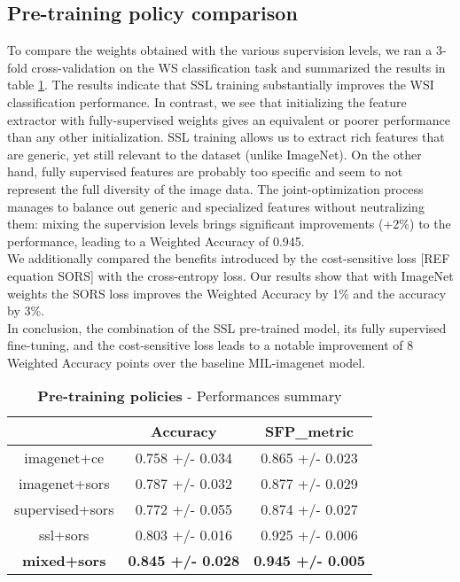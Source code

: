 \subsection{Pre-training policy comparison}
To compare the weights obtained with the various supervision levels, we ran a 3-fold cross-validation on the WS classification task and  summarized the results in table \ref{tab:pretraining}. 
The results indicate that SSL training substantially improves the WSI classification performance. In contrast, we see that initializing the feature extractor with fully-supervised weights gives an equivalent or poorer performance than any other initialization. SSL training allows us to extract rich features that are generic, yet still relevant to the dataset  (unlike ImageNet). On the other hand, fully supervised features are probably too specific and seem to not represent the full diversity of the image data. The joint-optimization process manages to balance out generic and specialized features without neutralizing them: mixing the supervision levels brings significant improvements (+2\%) to the performance, leading to a Weighted Accuracy of 0.945. \\
We additionally compared the benefits introduced by the cost-sensitive loss [REF equation SORS] with the cross-entropy loss. Our results show that with ImageNet weights the SORS loss improves the Weighted Accuracy by 1\% and the accuracy by 3\%. \\
In conclusion, the combination of the SSL pre-trained model, its fully supervised fine-tuning, and the cost-sensitive loss leads to a notable improvement of 8 Weighted Accuracy points over the baseline MIL-imagenet model.


\begin{table}[!t]
\centering
\begin{tabular}{ccc}
\hline
                    & \textbf{Accuracy}        & \textbf{SFP\_metric}     \\ \hline
imagenet+ce         & 0.758 +/- 0.034          & 0.865 +/- 0.023          \\
imagenet+sors       & 0.787 +/- 0.032          & 0.877 +/- 0.029          \\
supervised+sors     & 0.772 +/- 0.055          & 0.874 +/- 0.027          \\
ssl+sors            & 0.803 +/- 0.016          & 0.925 +/- 0.006          \\
\textbf{mixed+sors} & \textbf{0.845 +/- 0.028} & \textbf{0.945 +/- 0.005} \\ \hline
\end{tabular}

\caption{\textbf{Pre-training policies} - Performances summary}
\label{tab:pretraining}
\end{table}

